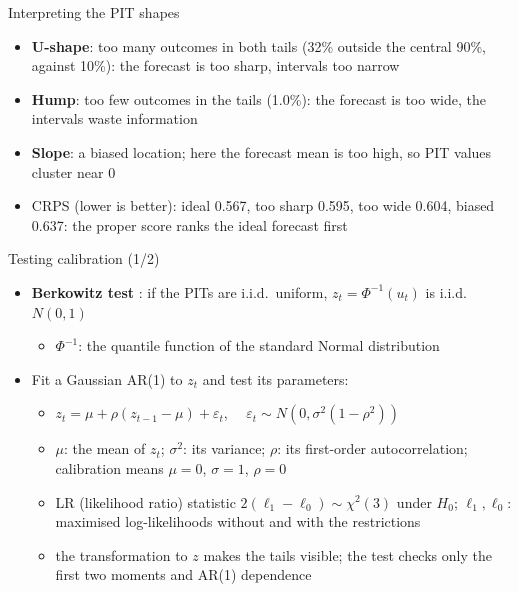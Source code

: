 \begin{frame}{Interpreting the PIT shapes}
\itemsize{\small}
\begin{itemize}
    \item \textbf{U-shape}: too many outcomes in both tails (32\% outside the central 90\%, against 10\%): the forecast is too sharp, intervals too narrow
    \item \textbf{Hump}: too few outcomes in the tails (1.0\%): the forecast is too wide, the intervals waste information
    \item \textbf{Slope}: a biased location; here the forecast mean is too high, so PIT values cluster near 0
    \item CRPS (lower is better): ideal 0.567, too sharp 0.595, too wide 0.604, biased 0.637: the proper score ranks the ideal forecast first
\end{itemize}
\end{frame}

\begin{frame}{Testing calibration (1/2)}
\itemsize{\small}
\begin{itemize}
    \item \textbf{Berkowitz test} : if the PITs are i.i.d.\ uniform, $z_t = \Phi^{-1}(u_t)$ is i.i.d.\ $N(0, 1)$
    \begin{itemize}
        \item $\Phi^{-1}$: the quantile function of the standard Normal distribution
    \end{itemize}
    \item Fit a Gaussian AR(1) to $z_t$ and test its parameters:
    \begin{itemize}
        \item $z_t = \mu + \rho(z_{t-1} - \mu) + \varepsilon_t$, $\quad \varepsilon_t \sim N(0, \sigma^2(1 - \rho^2))$
        \item $\mu$: the mean of $z_t$; $\sigma^2$: its variance; $\rho$: its first-order autocorrelation; calibration means $\mu = 0$, $\sigma = 1$, $\rho = 0$
        \item LR (likelihood ratio) statistic $2(\ell_1 - \ell_0) \sim \chi^2(3)$ under $H_0$; $\ell_1, \ell_0$: maximised log-likelihoods without and with the restrictions
        \item the transformation to $z$ makes the tails visible; the test checks only the first two moments and AR(1) dependence
    \end{itemize}
\end{itemize}
\end{frame}

